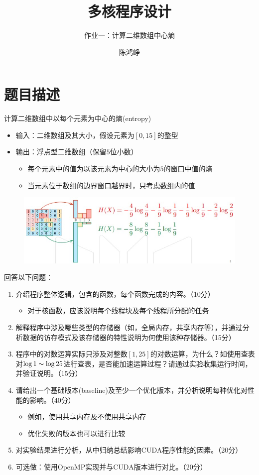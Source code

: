 \documentclass[logo,reportComp]{thesis}
\title{多核程序设计}
\subtitle{作业一：计算二维数组中心熵}
\author{陈鸿峥}
\begin{document}
\maketitle
\tableofcontents

\newpage

\section{题目描述}
计算二维数组中以每个元素为中心的熵(entropy)
\begin{itemize}
    \item 输入：二维数组及其大小，假设元素为$[0,15]$的整型
    \item 输出：浮点型二维数组（保留$5$位小数）
    \begin{itemize}
        \item 每个元素中的值为以该元素为中心的大小为$5$的窗口中值的熵
        \item 当元素位于数组的边界窗口越界时，只考虑数组内的值
    \end{itemize}
\end{itemize}
\begin{figure}[H]
\centering
\includegraphics[width=0.9\linewidth]{fig/entropy.jpg}
\end{figure}

回答以下问题：
\begin{enumerate}
\item 介绍程序整体逻辑，包含的函数，每个函数完成的内容。（10分）
\begin{itemize}
    \item 对于核函数，应该说明每个线程块及每个线程所分配的任务
\end{itemize}
\item 解释程序中涉及哪些类型的存储器（如，全局内存，共享内存等），并通过分析数据的访存模式及该存储器的特性说明为何使用该种存储器。（15分）
\item 程序中的对数运算实际只涉及对整数$[1,25]$的对数运算，为什么？如使用查表对$\log1\thicksim \log25$进行查表，是否能加速运算过程？请通过实验收集运行时间，并验证说明。（15分）
\item 请给出一个基础版本(baseline)及至少一个优化版本，并分析说明每种优化对性能的影响。（40分）
\begin{itemize}
    \item 例如，使用共享内存及不使用共享内存
    \item 优化失败的版本也可以进行比较
\end{itemize}
\item 对实验结果进行分析，从中归纳总结影响CUDA程序性能的因素。（20分）
\item 可选做：使用OpenMP实现并与CUDA版本进行对比。（20分）
\end{enumerate}
\end{document}
